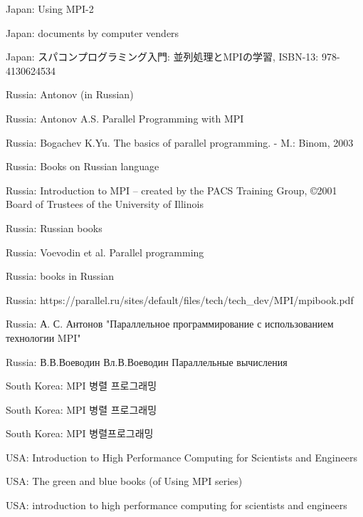 \item Japan: Using MPI-2
\item Japan: documents by computer venders
\item Japan: スパコンプログラミング入門: 並列処理とMPIの学習, ISBN-13: 978-4130624534
\item Russia: Antonov (in Russian)
\item Russia: Antonov A.S. Parallel Programming with MPI
\item Russia: Bogachev K.Yu. The basics of parallel programming. - M.: Binom, 2003
\item Russia: Books on Russian language
\item Russia: Introduction to MPI – created by the PACS Training Group, ©2001 Board of Trustees of the University of Illinois
\item Russia: Russian books
\item Russia: Voevodin et al. Parallel programming
\item Russia: books in Russian
\item Russia: https://parallel.ru/sites/default/files/tech/tech\_dev/MPI/mpibook.pdf
\item Russia: А. С. Антонов "Параллельное программирование с использованием технологии MPI"
\item Russia: В.В.Воеводин Вл.В.Воеводин Параллельные вычисления
\item South Korea: MPI 병렬 프로그래밍
\item South Korea: MPI 병렬 프로그래밍
\item South Korea: MPI 병렬프로그래밍
\item USA: Introduction to High Performance Computing for Scientists and Engineers
\item USA: The green and blue books (of Using MPI series)
\item USA: introduction to high performance computing for scientists and engineers
